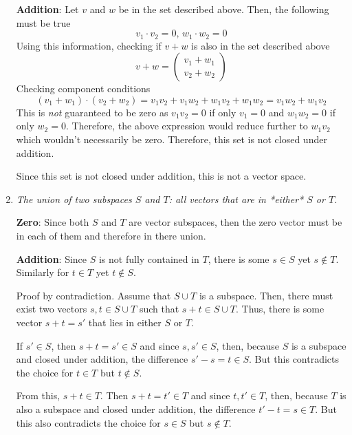 \documentclass{article}
\begin{document}
\begin{enumerate}
    \bigbreak

    {\bf Addition}: Let $ v $ and $ w $ be in the set described above. Then,
    the following must be true
    $$ v_1 \cdot v_2 = 0,\, w_1 \cdot w_2 = 0 $$
    Using this information, checking if $ v + w $ is also in the set
    described above
    $$ v + w = \begin{pmatrix}
        v_1 + w_1 \\
        v_2 + w_2
    \end{pmatrix} $$ 
    Checking component conditions
    $$ (v_1 + w_1) \cdot (v_2 + w_2) = v_1 v_2 + v_1 w_2 + w_1 v_2 + w_1 w_2
    = v_1 w_2 + w_1 v_2 $$
    This is \textit{not} guaranteed to be zero as $ v_1 v_2 = 0 $ if only $
    v_1 = 0 $ and $ w_1 w_2 = 0 $ if only $ w_2 = 0 $. Therefore, the above
    expression would reduce further to $ w_1 v_2 $ which wouldn't necessarily
    be zero. Therefore, this set is not closed under addition.
    
    \bigbreak

    Since this set is not closed under addition, this is not a vector space.

    \item \textit{The union of two subspaces $S$ and $T$: all vectors that
    are in *either* $S$ or $T$.}

    \bigbreak

    {\bf Zero}: Since both $S$ and $T$ are vector subspaces, then the zero vector
    must be in each of them and therefore in there union.

    \bigbreak

    {\bf Addition}: Since $ S $ is not fully contained in $ T $, there is
    some $ s \in S $ yet $ s \notin T $. Similarly for $ t \in T $ yet $ t
    \notin S $.
    
    Proof by contradiction. Assume that $ S \cup T $ is a subspace. Then,
    there must exist two vectors $ s, t \in S \cup T $ such that $ s + t \in
    S \cup T $. Thus, there is some vector $ s + t = s' $ that lies in either
    $ S $ or $ T $.
    
    If $ s' \in S $, then $ s + t = s' \in S $ and since $ s, s' \in S $,
    then, because $ S $ is a subspace and closed under addition, the difference
    $ s' - s = t \in S $. But this contradicts the choice for $ t \in T $ but
    $ t \notin S $.

    From this, $ s + t \in T $. Then $ s + t = t' \in T $ and since $ t, t'
    \in T $, then, because $ T $ is also a subspace and closed under
    addition, the difference $ t' - t = s \in T $. But this also contradicts
    the choice for $ s \in S $ but $ s \notin T $.


\end{enumerate}
\end{document}
